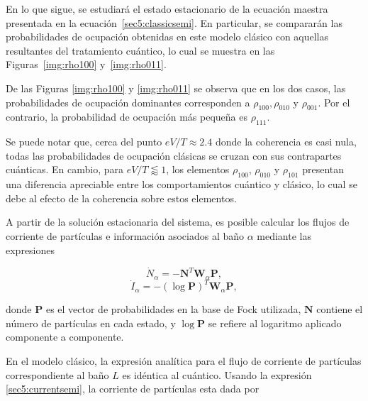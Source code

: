 En lo que sigue, se estudiará el estado estacionario de la ecuación maestra presentada en la ecuación~\ref{sec5:classicsemi}. En particular, se compararán las probabilidades de ocupación obtenidas en este modelo clásico con aquellas resultantes del tratamiento cuántico, lo cual se muestra en las Figuras~\ref{img:rho100} y~\ref{img:rho011}. 


De las Figuras \ref{img:rho100} y \ref{img:rho011} se observa que en los dos casos, las probabilidades de ocupación dominantes corresponden a $\rho_{100},\rho_{010}$ y $\rho_{001}$. Por el contrario, la probabilidad de ocupación más pequeña es $\rho_{111}$.
 
Se puede notar que, cerca del punto $eV/T \approx 2.4$ donde la coherencia es casi nula, todas las probabilidades de ocupación clásicas se cruzan con sus contrapartes cuánticas. En cambio, para $eV/T \lessapprox 1$, los elementos $\rho_{100}$, $\rho_{010}$ y $\rho_{101}$ presentan una diferencia apreciable entre los comportamientos cuántico y clásico, lo cual se debe al efecto de la coherencia sobre estos elementos.


A partir de la solución estacionaria del sistema, es posible calcular los flujos de corriente de partículas e información asociados al baño $\alpha$ mediante las expresiones

\begin{equation}
    \dot{N}_{\alpha} = -\mathbf{N}^{T} \mathbf{W}_{\alpha}\mathbf{P},
    \label{sec5:currentsemi}
\end{equation}
\begin{equation}
    \dot{I}_{\alpha} = -(\log \mathbf{P})^{T} \mathbf{W}_{\alpha}\mathbf{P},
    \label{sec5:infosemi}
\end{equation}

donde $\mathbf{P}$ es el vector de probabilidades en la base de Fock utilizada, $\mathbf{N}$ contiene el número de partículas en cada estado, y $\log \mathbf{P}$ se refiere al logaritmo aplicado componente a componente.

En el modelo clásico, la expresión analítica para el flujo de corriente de partículas correspondiente al baño $L$ es idéntica al cuántico. Usando la expresión \ref{sec5:currentsemi}, la corriente de partículas esta dada por  

